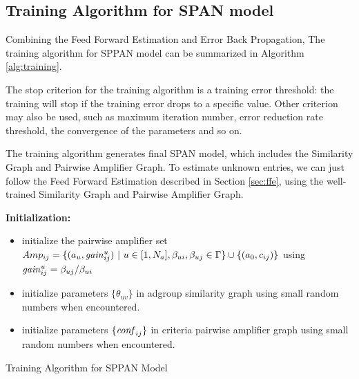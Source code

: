 \subsection{Training Algorithm for SPAN model}
Combining the Feed Forward Estimation and Error Back Propagation, The
training algorithm for SPPAN model can be summarized in Algorithm
\ref{alg:training}.

The stop criterion for the training algorithm is a training error
threshold: the training will stop if the training error drops to a
specific value. Other criterion may also be used, such as maximum
iteration number\cite{?}, error reduction rate threshold\cite{?}, the
convergence of the parameters\cite{?} and so on.

The training algorithm generates final SPAN model, which includes the
Similarity Graph and Pairwise Amplifier Graph. To estimate unknown
entries, we can just follow the Feed Forward Estimation described in
Section \ref{sec:ffe}, using the well-trained Similarity Graph and
Pairwise Amplifier Graph.


\begin{algorithm}
  \textbf{Initialization:}\\
  \begin{itemize}
  \item initialize the pairwise amplifier set
    $Amp_{ij}=\{(a_u,\mathit{gain}^{u}_{ij})~|~u\in
    [1,N_a],\beta_{ui},\beta_{uj}\in \Gamma\} \cup \{(a_0,c_{ij})\}$
    using $\mathit{gain}^{u}_{ij}=\beta_{uj}/\beta_{ui}$
  \item initialize parameters $\{\theta_{uv}\}$ in adgroup similarity
    graph using small random numbers when encountered.
  \item initialize parameters $\{\mathit{conf}_{ij}\}$ in criteria pairwise
    amplifier graph using small random numbers when encountered.
  \end{itemize}
  \caption{Training Algorithm for SPPAN Model}
  \label{alg:training}
\end{algorithm}

